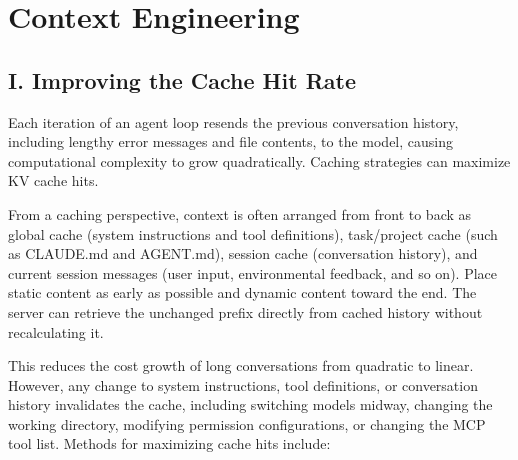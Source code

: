 \setcounter{section}{2}

\hypertarget{context-engineering}{%
\section{Context Engineering}\label{context-engineering}}

\hypertarget{i.-improving-the-cache-hit-rate}{%
\subsection{I. Improving the Cache Hit Rate}\label{i.-improving-the-cache-hit-rate}}

Each iteration of an agent loop resends the previous conversation history, including lengthy error messages and file contents, to the model, causing computational complexity to grow quadratically. Caching strategies can maximize KV cache hits.

From a caching perspective, context is often arranged from front to back as global cache (system instructions and tool definitions), task/project cache (such as CLAUDE.md and AGENT.md), session cache (conversation history), and current session messages (user input, environmental feedback, and so on). Place static content as early as possible and dynamic content toward the end. The server can retrieve the unchanged prefix directly from cached history without recalculating it.

This reduces the cost growth of long conversations from quadratic to linear. However, any change to system instructions, tool definitions, or conversation history invalidates the cache, including switching models midway, changing the working directory, modifying permission configurations, or changing the MCP tool list. Methods for maximizing cache hits include:

